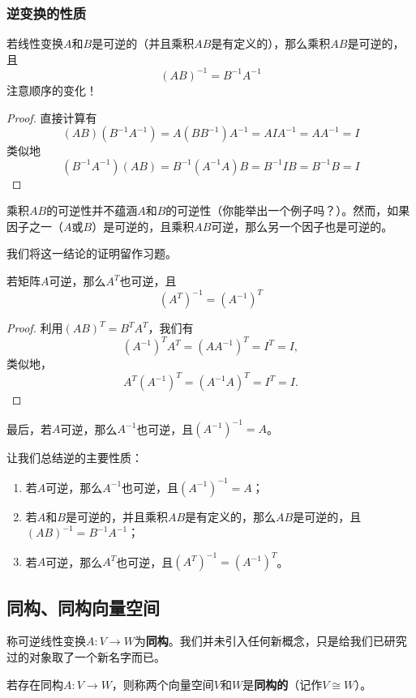 \subsubsection{逆变换的性质}

\begin{theorem}[乘积的逆]
    若线性变换$A$和$B$是可逆的（并且乘积$AB$是有定义的），那么乘积$AB$是可逆的，且\[(AB)^{-1}=B^{-1}A^{-1}\]
    注意顺序的变化！
\end{theorem}
\begin{proof}
    直接计算有\[(AB)(B^{-1}A^{-1})=A(BB^{-1})A^{-1}=AIA^{-1}=AA^{-1}=I\]
    类似地\[(B^{-1}A^{-1})(AB)=B^{-1}(A^{-1}A)B=B^{-1}IB=B^{-1}B=I\]
\end{proof}

\begin{remark}
    乘积$AB$的可逆性并不蕴涵$A$和$B$的可逆性（你能举出一个例子吗？）。然而，如果因子之一（$A$或$B$）是可逆的，且乘积$AB$可逆，那么另一个因子也是可逆的。

    我们将这一结论的证明留作习题。
\end{remark}

\begin{theorem}[$A^T$的逆]
    若矩阵$A$可逆，那么$A^T$也可逆，且\[(A^T)^{-1}=(A^{-1})^T\]
\end{theorem}
\begin{proof}
    利用$(AB)^{T}=B^{T}A^{T}$，我们有\[(A^{-1})^TA^T=(AA^{-1})^T=I^T=I,\]
    类似地，\[A^T(A^{-1})^T=(A^{-1}A)^T=I^T=I.\]
\end{proof}
最后，若$A$可逆，那么$A^{-1}$也可逆，且$(A^{-1})^{-1}=A$。

让我们总结逆的主要性质：
\begin{enumerate}
    \item 若$A$可逆，那么$A^{-1}$也可逆，且$(A^{-1})^{-1}=A$；
    \item 若$A$和$B$是可逆的，并且乘积$AB$是有定义的，那么$AB$是可逆的，且$(AB)^{-1}=B^{-1}A^{-1}$；
    \item 若$A$可逆，那么$A^T$也可逆，且$(A^T)^{-1}=(A^{-1})^T$。
\end{enumerate}

\subsection{同构、同构向量空间}

称可逆线性变换$A:V\to W$为{\bf 同构}。我们并未引入任何新概念，只是给我们已研究过的对象取了一个新名字而已。

若存在同构$A:V\to W$，则称两个向量空间$V$和$W$是{\bf 同构的}（记作$V\cong W$）。

